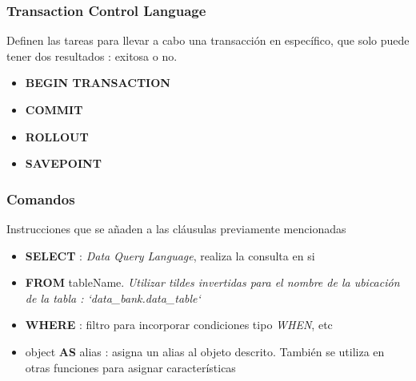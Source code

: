 \subsubsection{Transaction Control Language}
Definen las tareas para llevar a cabo una transacción en específico, que solo puede tener dos resultados : exitosa o no. 
\begin{itemize}
    \item {\textbf{BEGIN TRANSACTION}}
    \item {\textbf{COMMIT}}
    \item {\textbf{ROLLOUT}}
    \item {\textbf{SAVEPOINT}}
\end{itemize}

\subsubsection{Comandos}
Instrucciones que se añaden a las cláusulas previamente mencionadas
\begin{itemize}
    \item {\textbf{SELECT} : \textit{Data Query Language}, realiza la consulta en si}
    \item {\textbf{FROM} tableName. \textit{Utilizar tildes invertidas para el nombre de la ubicación de la tabla : `data\_bank.data\_table`}}
    \item {\textbf{WHERE} : filtro para incorporar condiciones tipo \textit{WHEN}, etc}
    \item {object \textbf{AS} alias : asigna un alias al objeto descrito. También se utiliza en otras funciones para asignar características}
\end{itemize}

